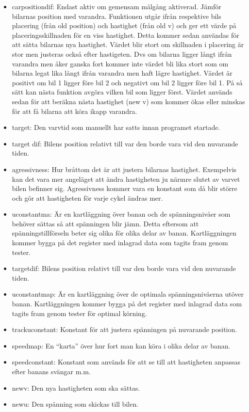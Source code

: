 \begin{itemize}
      \item car\textunderscore position\textunderscore dif: Endast aktiv om gemensam målgång aktiverad. Jämför bilarnas position med varandra. Funktionen utgår ifrån respektive bils placering (från old position) och hastighet (från old v) 
och ger ett värde på placeringsskillnaden för en viss hastighet. Detta kommer
sedan användas för att sätta bilarnas nya hastighet. Värdet blir stort om skillnaden i placering är stor men justeras också efter hastigeten. Dvs om bilarna ligger långt ifrån varandra men åker ganska fort kommer inte värdet bli lika stort som om bilarna legat lika långt ifrån varandra men haft lägre hastighet. Värdet är positivt om bil 1 ligger före bil 2 och negativt om bil 2 ligger före bil 1. På så sätt kan nästa funktion avgöra vilken bil som ligger först.
Värdet används sedan för att beräkna nästa hastighet (new v) som kommer ökas eller minskas för att få bilarna att köra ikapp varandra. 

      \item target: Den varvtid som manuellt har satts innan programet startade.
      \item target dif: Bilens position relativt till var den borde vara vid den nuvarande tiden.
      \item agressivness: Hur bråttom det är att justera bilarnas hastighet. Exempelvis kan det vara mer angeläget att ändra hastigheten ju närmre slutet av varvet bilen befinner sig. Agressivness kommer vara en konstant som då blir större och gör att hastigheten för varje cykel ändras mer.
      \item u\textunderscore constant\textunderscore ma: Är en kartläggning över banan och de spänningsnivåer som behöver sättas så att spänningen blir jämn. Detta eftersom att spänningstillförseln beter sig olika för olika delar av banan. Kartläggningen kommer bygga på det register med inlagrad data som tagits fram genom tester.
      \item target\textunderscore dif: Bilens position relativt till var den borde vara vid den nuvarande tiden.
      \item u\textunderscore constant\textunderscore map: Är en kartläggning över de optimala spänningsnivåerna utöver banan. Kartläggningen kommer bygga på det register med inlagrad data som tagits fram genom tester för optimal körning.
      \item track\textunderscore u\textunderscore constant: Konstant för att justera spänningen på nuvarande position.
      \item speed\textunderscore map: En ``karta'' över hur fort man kan köra i olika delar av banan.
      \item speed\textunderscore constant: Konstant som används för att se till att hastigheten anpassas efter banans svängar m.m.
      \item new\textunderscore v: Den nya hastigheten som ska sättas.
      \item new\textunderscore u: Den spänning som skickas till bilen.

    \end{itemize}

